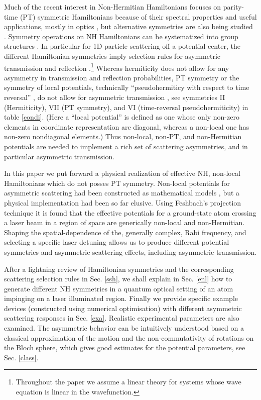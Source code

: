 Much of the recent interest in Non-Hermitian Hamiltonians focuses on  parity-time (PT) symmetric Hamiltonians \cite{Bender1998,Znojil2015}  because of their spectral properties and useful applications, mostly in optics  \cite{Longhi2017a,Konotop2016,Longhi2014}, but  alternative symmetries are also being studied \cite{Nixon2016,Nixon2016a,Chen2017,Ruschhaupt2017,Simon2018,Simon2019a,Alana2020,Bernard2002,Kawabata2019}. Symmetry operations
on NH Hamiltonians can be systematized into group structures \cite{Ruschhaupt2017,Simon2019a,Alana2020}.  In particular for
1D particle scattering off a potential center, the different Hamiltonian symmetries imply
selection rules for asymmetric transmission and reflection \cite{Ruschhaupt2017,Simon2019a}.\footnote{Throughout the paper we assume a linear theory for systems whose wave equation is linear in the wavefunction.}
Whereas hermiticity does not allow for any asymmetry in transmission and reflection probabilities,   PT symmetry or
the symmetry of local potentials, technically ``pseudohermiticy with respect to time reversal'' \cite{Ruschhaupt2017},
do not allow for  asymmetric transmission \cite{Muga2004,Mostafazadeh2018}, see symmetries II (Hermiticity), VII (PT symmetry),  and VI
(time-reversal pseudohermiticity) in table \ref{condi}.
(Here a ``local potential'' is defined as one whose only non-zero elements in coordinate representation are diagonal, whereas a non-local one has  non-zero nondiagonal elements.)
%
%
Thus  non-local, non-PT, and non-Hermitian potentials are needed to implement a rich set of scattering
asymmetries, and in particular asymmetric transmission.

In this paper we put forward a physical realization of  effective NH, non-local  Hamiltonians which do not posses PT symmetry.
Non-local potentials for asymmetric scattering had been constructed as mathematical models \cite{Ruschhaupt2017}, but a physical implementation  had been so far elusive.
Using Feshbach's projection technique it is found that the
effective potentials for a ground-state atom crossing a laser beam in a region of space are generically non-local and non-Hermitian. Shaping the spatial-dependence of the, generally complex, Rabi frequency, and selecting a specific laser detuning allows us to produce different potential symmetries and asymmetric scattering effects, including asymmetric transmission.

After a lightning review of Hamiltonian symmetries and the corresponding scattering selection rules in Sec. \ref{ssh},
we shall  explain in Sec. \ref{enl} how to generate different NH symmetries in a quantum optical setting of an atom impinging on a laser illuminated region. Finally we provide specific example devices (constructed using numerical optimisation) with different asymmetric scattering responses in Sec. \ref{exa}. Realistic experimental parameters are also examined. The asymmetric behavior can be intuitively understood based on a classical approximation of the motion and the non-commutativity of rotations on the Bloch sphere, which gives good estimates for the potential parameters, see Sec. \ref{class}.

